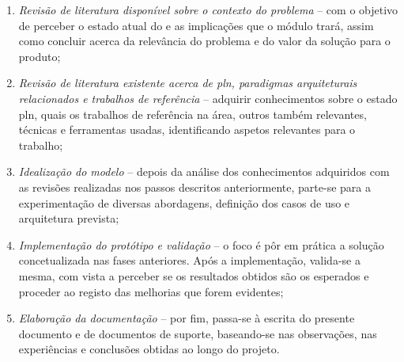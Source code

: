 \begin{enumerate}
    \item 
    {
        \textit{Revisão de literatura disponível sobre o contexto do problema} -- com o objetivo de perceber o estado atual do {\productname} e as implicações que o módulo trará, assim como concluir acerca da relevância do problema e do valor da solução para o produto;
    }
    \item
    {
        \textit{Revisão de literatura existente acerca de \gls{pln}, paradigmas arquiteturais relacionados e trabalhos de referência} -- adquirir conhecimentos sobre o estado \gls{pln}, quais os trabalhos de referência na área, outros também relevantes, técnicas e ferramentas usadas, identificando aspetos relevantes para o trabalho;
    }
    \item
    {
        \textit{Idealização do modelo} -- depois da análise dos conhecimentos adquiridos com as revisões realizadas nos passos descritos anteriormente,
        parte-se para a experimentação de diversas abordagens, definição dos casos de uso e arquitetura prevista;
    }
    \item
    {
        \textit{Implementação do protótipo e validação} -- o foco é pôr em prática a solução concetualizada nas fases anteriores. Após a implementação, valida-se a mesma, com vista a perceber se os resultados obtidos são os esperados e proceder ao registo das melhorias que forem evidentes;
    }
    \item
    {
        \textit{Elaboração da documentação} --  por fim, passa-se à escrita do presente documento e de documentos de suporte, baseando-se nas observações, nas experiências e conclusões obtidas ao longo do projeto.
    }
\end{enumerate}
